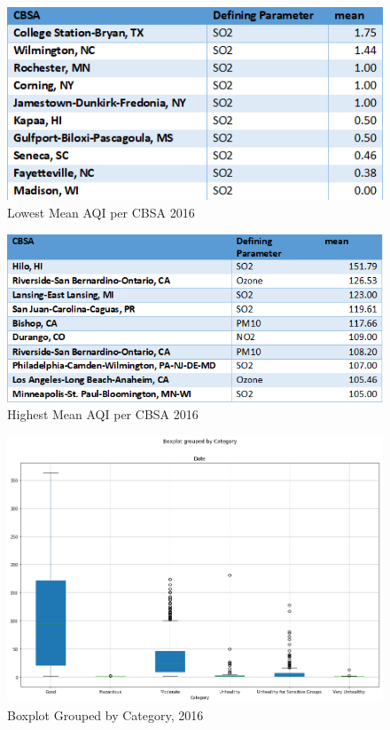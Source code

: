 \documentclass[sigconf]{acmart}
\begin{document}
\begin{figure}[htb]
\includegraphics[width=1.0\columnwidth]{images/lowestmeanaqipercbsa.png}
  \caption{Lowest Mean AQI per CBSA 2016}
  \label{Lowest Mean AQI per CBSA 2016}
\end{figure}

\begin{figure}[htb]
\includegraphics[width=1.0\columnwidth]{images/cbsahighestaqi.png}
  \caption{Highest Mean AQI per CBSA 2016}
  \label{Highest Mean AQI per CBSA 2016}
\end{figure}

\begin{figure}[htb]
\includegraphics[width=1.0\columnwidth]{images/boxplotofcountofaqibycategory2016.png}
  \caption{Boxplot Grouped by Category, 2016}
  \label{boxplot}
\end{figure}
\end{document}
